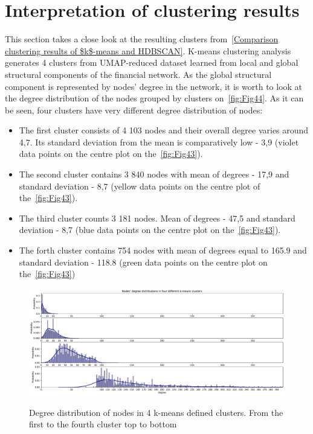 \section{Interpretation of clustering results}
This section takes a close look at the resulting clusters from~\ref{Comparison clustering results of $k$-means and HDBSCAN}. K-means clustering analysis generates 4 clusters from UMAP-reduced dataset learned from local and global structural components of the financial network. As the global structural component is represented by nodes' degree in the network, it is worth to look at the degree distribution of the nodes grouped by clusters on~\autoref{fig:Fig44}. As it can be seen, four clusters have very different degree distribution of nodes: 
    \begin{itemize}
        \item The first cluster consists of 4 103 nodes and their overall degree varies around 4,7. Its standard deviation from the mean is comparatively low - 3,9 (violet data points on the centre plot on the~\autoref{fig:Fig43}).
        \item The second cluster contains 3 840 nodes with mean of degrees - 17,9 and standard deviation - 8,7 (yellow data points on the centre plot of the~\autoref{fig:Fig43}).
        \item The third cluster counts 3 181 nodes. Mean of degrees - 47,5 and standard deviation - 8,7 (blue data points on the centre plot on the~\autoref{fig:Fig43}).
        \item The forth cluster contains 754 nodes with mean of degrees equal to 165.9 and standard deviation - 118.8 (green data points on the centre plot on the~\autoref{fig:Fig43})
    \end{itemize}
    
\begin{figure}[!ht]
	\centering
	\includegraphics[width=1.0\textwidth]{images/evaluations/Fig44.pdf}\\
	\caption{Degree distribution of nodes in 4 k-means defined clusters. From the first to the fourth cluster top to bottom}
	\label{fig:Fig44}
\end{figure}

